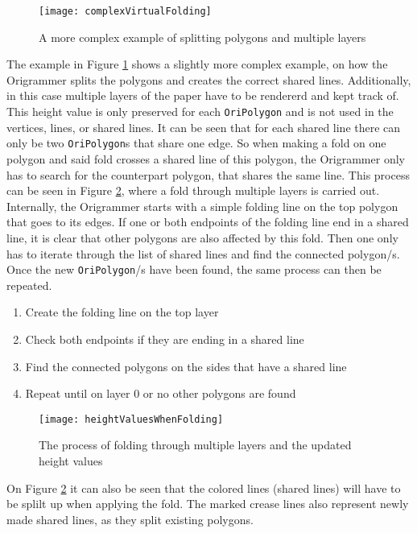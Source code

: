 \newpage

 \begin{figure}[htbp]
	\centering
	\texttt{[image: complexVirtualFolding]}
	\caption{A more complex example of splitting polygons and multiple layers}
	\label{fig:complexVirtualFolding}
\end{figure}

\noindent The example in Figure \ref{fig:complexVirtualFolding} shows a slightly more complex example, on how the Origrammer splits the polygons and creates the correct shared lines. Additionally, in this case multiple layers of the paper have to be rendererd and kept track of. This height value is only preserved for each \texttt{OriPolygon} and is not used in the vertices, lines, or shared lines. It can be seen that for each shared line there can only be two \texttt{OriPolygon}s that share one edge. So when making a fold on one polygon and said fold crosses a shared line of this polygon, the Origrammer only has to search for the counterpart polygon, that shares the same line. This process can be seen in Figure \ref{fig:heightValuesWhenFolding}, where a fold through multiple layers is carried out. Internally, the Origrammer starts with a simple folding line on the top polygon that goes to its edges. If one or both endpoints of the folding line end in a shared line, it is clear that other polygons are also affected by this fold. Then one only has to iterate through the list of shared lines and find the connected polygon/s. Once the new \texttt{OriPolygon}/s have been found, the same process can then be repeated.


\begin{enumerate}
\item Create the folding line on the top layer
\item Check both endpoints if they are ending in a shared line
\item Find the connected polygons on the sides that have a shared line
\item Repeat until on layer 0 or no other polygons are found
\end{enumerate}

\begin{figure}[htbp]
	\centering
	\texttt{[image: heightValuesWhenFolding]}
	\caption{The process of folding through multiple layers and the updated height values}
	\label{fig:heightValuesWhenFolding}
\end{figure}

\noindent On Figure \ref{fig:heightValuesWhenFolding} it can also be seen that the colored lines (shared lines) will have to be splilt up when applying the fold. The marked crease lines also represent newly made shared lines, as they split existing polygons.

